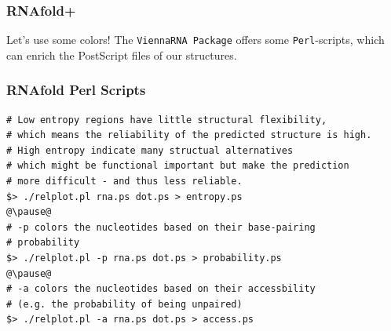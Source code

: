 \begin{frame}[t, fragile]\frametitle{RNAfold+}
  
  \begin{block}{Let's use some colors!}
      The \texttt{ViennaRNA Package} offers some \texttt{Perl}-scripts, which can enrich the PostScript files of our structures.
  \end{block}
  \vfill
  
   \hfill
   \hfill
  
  
\end{frame}

\begin{frame}[c, fragile]\frametitle{RNAfold Perl Scripts}
  \begin{lstlisting}
# Low entropy regions have little structural flexibility, 
# which means the reliability of the predicted structure is high.
# High entropy indicate many structual alternatives
# which might be functional important but make the prediction
# more difficult - and thus less reliable.
$> ./relplot.pl rna.ps dot.ps > entropy.ps
@\pause@
# -p colors the nucleotides based on their base-pairing
# probability
$> ./relplot.pl -p rna.ps dot.ps > probability.ps
@\pause@
# -a colors the nucleotides based on their accessbility
# (e.g. the probability of being unpaired)
$> ./relplot.pl -a rna.ps dot.ps > access.ps
  \end{lstlisting}
\end{frame}

